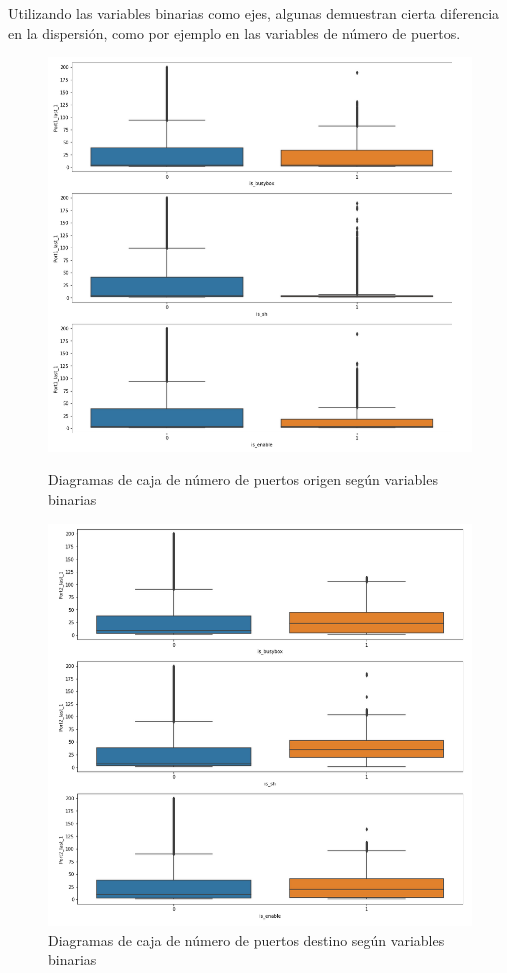 Utilizando las variables binarias como ejes, algunas demuestran cierta diferencia en la dispersión, como por ejemplo en las variables de número de puertos.

\begin{figure}[H]
   \begin{minipage}[b]{0.48\textwidth}
     \centering
     \includegraphics[width=0.8\linewidth]{figs/port1_bin.PNG}
     \caption{Diagramas de caja de número de puertos origen según variables binarias}
     \label{Fig:port1_bin}
   \end{minipage}\hfill
   \begin{minipage}[b]{0.48\textwidth}
     \centering
     \includegraphics[width=0.8\linewidth]{figs/port2_bin.PNG}
     \caption{Diagramas de caja de número de puertos destino según variables binarias}
     \label{Fig:port2_bin}
   \end{minipage}
\end{figure}

